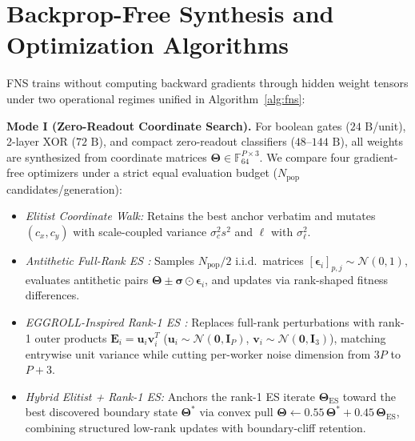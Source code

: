 \section{Backprop-Free Synthesis and Optimization Algorithms}
\label{sec:alg}

FNS trains without computing backward gradients through hidden weight tensors under two operational regimes unified in Algorithm~\ref{alg:fns}:

\textbf{Mode I (Zero-Readout Coordinate Search).} For boolean gates ($24\text{ B}$/unit), 2-layer XOR ($72\text{ B}$), and compact zero-readout classifiers ($48\text{--}144\text{ B}$), all weights are synthesized from coordinate matrices $\boldsymbol{\Theta}\in\mathbb{F}_{64}^{P\times 3}$. We compare four gradient-free optimizers under a strict equal evaluation budget ($N_{\mathrm{pop}}$ candidates/generation):
\begin{itemize}
    \item \textit{Elitist Coordinate Walk:} Retains the best anchor verbatim and mutates $(c_x, c_y)$ with scale-coupled variance $\sigma_c^2 s^2$ and $\ell$ with $\sigma_\ell^2$.
    \item \textit{Antithetic Full-Rank ES \cite{salimans2017evolution}:} Samples $N_{\mathrm{pop}}/2$ i.i.d.\ matrices $[\boldsymbol{\epsilon}_i]_{p,j} \sim \mathcal{N}(0,1)$, evaluates antithetic pairs $\boldsymbol{\Theta} \pm \boldsymbol{\sigma}\odot\boldsymbol{\epsilon}_i$, and updates via rank-shaped fitness differences.
    \item \textit{EGGROLL-Inspired Rank-1 ES \cite{sarkar2025eggroll}:} Replaces full-rank perturbations with rank-1 outer products $\mathbf{E}_i = \mathbf{u}_i\mathbf{v}_i^T$ ($\mathbf{u}_i \sim \mathcal{N}(\mathbf{0}, \mathbf{I}_P)$, $\mathbf{v}_i \sim \mathcal{N}(\mathbf{0}, \mathbf{I}_3)$), matching entrywise unit variance while cutting per-worker noise dimension from $3P$ to $P+3$.
    \item \textit{Hybrid Elitist + Rank-1 ES:} Anchors the rank-1 ES iterate $\boldsymbol{\Theta}_{\mathrm{ES}}$ toward the best discovered boundary state $\boldsymbol{\Theta}^*$ via convex pull $\boldsymbol{\Theta} \leftarrow 0.55\,\boldsymbol{\Theta}^* + 0.45\,\boldsymbol{\Theta}_{\mathrm{ES}}$, combining structured low-rank updates with boundary-cliff retention.
\end{itemize}

